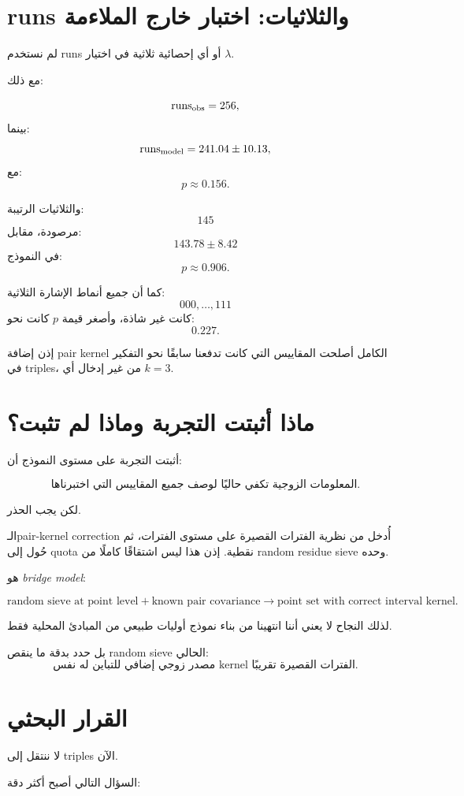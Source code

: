 \documentclass[12pt]{article}
\begin{document}
\section{runs والثلاثيات: اختبار خارج الملاءمة}

لم نستخدم runs أو أي إحصائية ثلاثية في اختيار \(\lambda\).

مع ذلك:

\[
\mathrm{runs}_{\rm obs}=256,
\]
بينما:
\[
\mathrm{runs}_{\rm model}=241.04\pm10.13,
\]
مع:
\[
p\approx0.156.
\]

والثلاثيات الرتيبة:
\[
145
\]
مرصودة، مقابل:
\[
143.78\pm8.42
\]
في النموذج:
\[
p\approx0.906.
\]

كما أن جميع أنماط الإشارة الثلاثية:
\[
000,\ldots,111
\]
كانت غير شاذة، وأصغر قيمة \(p\) كانت نحو:
\[
0.227.
\]

إذن إضافة pair kernel الكامل أصلحت المقاييس التي كانت تدفعنا سابقًا
نحو التفكير في triples، من غير إدخال أي \(k=3\).

\section{ماذا أثبتت التجربة وماذا لم تثبت؟}

أثبتت التجربة على مستوى النموذج أن:

\[
\boxed{
\text{المعلومات الزوجية تكفي حاليًا لوصف جميع المقاييس التي اختبرناها.}
}
\]

لكن يجب الحذر.

الـpair-kernel correction أُدخل من نظرية الفترات القصيرة على مستوى
الفترات، ثم حُول إلى quota نقطية.
إذن هذا ليس اشتقاقًا كاملًا من random residue sieve وحده.

هو \emph{bridge model}:

\[
\text{random sieve at point level}
+
\text{known pair covariance}
\longrightarrow
\text{point set with correct interval kernel}.
\]

لذلك النجاح لا يعني أننا انتهينا من بناء نموذج أوليات طبيعي من المبادئ
المحلية فقط.

بل حدد بدقة ما ينقص random sieve الحالي:
\[
\boxed{
\text{مصدر زوجي إضافي للتباين له نفس kernel الفترات القصيرة تقريبًا.}
}
\]

\section{القرار البحثي}

لا ننتقل إلى triples الآن.

السؤال التالي أصبح أكثر دقة:
\end{document}
